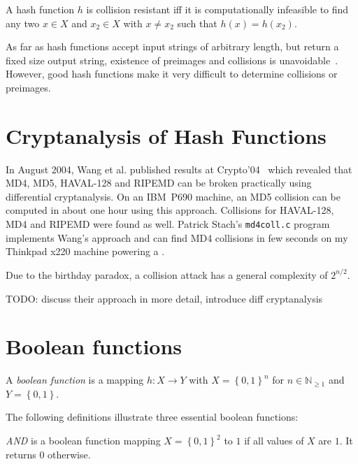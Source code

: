 \begin{defi}
  A hash function $h$ is collision resistant iff it is computationally infeasible to
  find any two $x \in X$ and $x_2 \in X$ with $x \neq x_2$ such that $h(x) = h(x_2)$.
\end{defi}

As far as hash functions accept input strings of arbitrary length, but return a fixed
size output string, existence of preimages and collisions is unavoidable~\cite{schlaffer}.
However, good hash functions make it very difficult to determine collisions or preimages.

\section{Cryptanalysis of Hash Functions}
\label{ch:cryptanalysis}
%
In August 2004, Wang et al. published results at Crypto'04~\cite{wang2004} which revealed
that MD4, MD5, HAVAL-128 and RIPEMD can be broken practically using differential cryptanalysis.
On an IBM~P690 machine, an MD5 collision can be computed in about one hour using this approach.
Collisions for HAVAL-128, MD4 and RIPEMD were found as well. Patrick Stach's \texttt{md4coll.c}
program~\cite{md4coll} implements Wang's approach and can find MD4 collisions in few seconds
on my Thinkpad x220 machine powering a .

Due to the birthday paradox, a collision attack has a general complexity of $2^{n/2}$.

TODO: discuss their approach in more detail, introduce diff cryptanalysis

\section{Boolean functions}
\label{ch:bool-functions}
%
\begin{defi}
  A \emph{boolean function} is a mapping $h: X \to Y$ with $X = \left\{0,1\right\}^n$
  for $n \in \mathbb N_{\geq 1}$ and $Y = \left\{0,1\right\}$.
\end{defi}

The following definitions illustrate three essential boolean functions:

\begin{defi}
  \emph{AND} is a boolean function mapping $X = \left\{0,1\right\}^2$
  to $1$ if all values of $X$ are $1$. It returns $0$ otherwise.
\end{defi}

